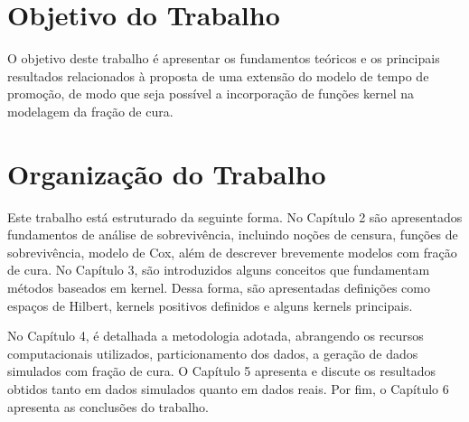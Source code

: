 \section{Objetivo do Trabalho}

O objetivo deste trabalho é apresentar os fundamentos teóricos e os principais resultados relacionados
à proposta de uma extensão do modelo de tempo de promoção, de modo que seja possível a incorporação de funções
kernel na modelagem da fração de cura.


\section{Organização do Trabalho}

Este trabalho está estruturado da seguinte forma. No Capítulo 2 são apresentados fundamentos de análise de sobrevivência,
incluindo noções de censura, funções de sobrevivência, modelo de Cox, além de descrever brevemente modelos com
fração de cura. No Capítulo 3, são introduzidos alguns conceitos que fundamentam métodos baseados em kernel. Dessa forma,
são apresentadas definições como espaços de Hilbert, kernels positivos definidos e alguns kernels principais.

No Capítulo 4, é detalhada a metodologia adotada, abrangendo os recursos computacionais utilizados,
particionamento dos dados, a geração de dados simulados com fração de cura. O Capítulo 5 apresenta
e discute os resultados obtidos tanto em dados simulados quanto em dados reais. Por fim, o Capítulo 6
apresenta as conclusões do trabalho.
